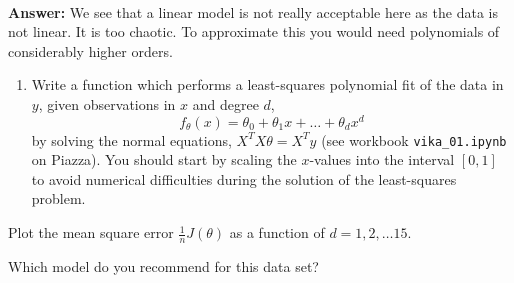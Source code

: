\documentclass[11pt]{article}
\providecommand{\tightlist}{%
      \setlength{\itemsep}{0pt}\setlength{\parskip}{0pt}}
\begin{document}
    \begin{center}
    \end{center}
    { \hspace*{\fill} \\}
    
    \textbf{Answer:} We see that a linear model is not really acceptable
here as the data is not linear. It is too chaotic. To approximate this
you would need polynomials of considerably higher orders.

    \begin{enumerate}
\def\labelenumi{\alph{enumi})}
\setcounter{enumi}{1}
\tightlist
\item
  Write a function which performs a least-squares polynomial fit of the
  data in \(y\), given observations in \(x\) and degree \(d\), \[
  f_\theta(x) = \theta_0 + \theta_1 x + \ldots + \theta_d x^d
  \] by solving the normal equations, \(X^T X \theta = X^T y\) (see
  workbook \texttt{vika\_01.ipynb} on Piazza). You should start by
  scaling the \(x\)-values into the interval \([0, 1]\) to avoid
  numerical difficulties during the solution of the least-squares
  problem.
\end{enumerate}

Plot the mean square error \(\frac{1}{n}J(\theta)\) as a function of
\(d=1,2,\ldots 15\).

Which model do you recommend for this data set?
\end{document}
